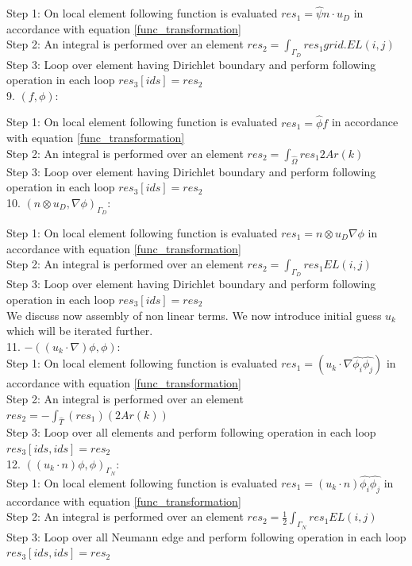 \documentclass[a4paper]{book}
\begin{document}
Step 1: On local element following function is evaluated $res_1=\hat{\psi} n\cdot u_D$ in accordance with equation \ref{func_transformation}\\
Step 2: An integral is performed over an element $res_2=\int_{\Gamma_D} res_1 grid.EL(i,j) $\\
Step 3: Loop over element having Dirichlet boundary and perform following operation in each loop $res_3[ids]=res_2$\\

9. $(f,\phi) $:

Step 1: On local element following function is evaluated $res_1= \hat{\phi} f$ in accordance with equation \ref{func_transformation}\\
Step 2: An integral is performed over an element $res_2=\int_{\hat{\Omega}} res_1 2 Ar(k)$\\
Step 3: Loop over element having Dirichlet boundary and perform following operation in each loop $res_3[ids]=res_2$\\


10. $(n \otimes u_D,\nabla \phi)_{\Gamma_D} $:

Step 1: On local element following function is evaluated $res_1= n \otimes u_D  \nabla \phi$ in accordance with equation \ref{func_transformation}\\
Step 2: An integral is performed over an element $res_2=\int_{\Gamma_D} res_1 EL(i,j)$\\
Step 3: Loop over element having Dirichlet boundary and perform following operation in each loop $res_3[ids]=res_2$\\

We discuss now assembly of non linear terms. We now introduce initial guess $u_k$ which will be iterated further.\\

11. $-((u_k \cdot \nabla)\phi , \phi)$:\\
Step 1: On local element following function is evaluated $res_1 = (u_k \cdot \nabla \hat{\phi_i} \hat{\phi_j}) $ in accordance with equation \ref{func_transformation}\\
Step 2: An integral is performed over an element $res_2= - \int_{\hat{T}} (res_1) (2Ar(k))$\\
Step 3: Loop over all elements and perform following operation in each loop $res_3[ids,ids]=res_2$\\

12. $((u_k \cdot n)\phi , \phi)_{\Gamma_N}$:\\
Step 1: On local element following function is evaluated $res_1 = (u_k \cdot n) \hat{\phi_i} \hat{\phi_j}$ in accordance with equation \ref{func_transformation}\\
Step 2: An integral is performed over an element $res_2 = \frac{1}{2}  \int_{\Gamma_N} res_1 EL(i,j) $\\
Step 3: Loop over all Neumann edge and perform following operation in each loop $res_3[ids,ids] = res_2$\\
\end{document}
